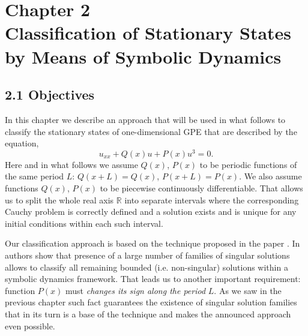 \chapter*{{\normalfont Chapter 2} \\ Classification of Stationary States by Means of Symbolic Dynamics}
\label{chapter:II}

\section*{2.1 Objectives}

In this chapter we describe an approach that will be used in what follows to classify the stationary states of one-dimensional GPE that are described by the equation,
\begin{equation}
	u_{xx} + Q(x) u + P(x) u^3 = 0.
	\label{eq:stationary}
\end{equation}
Here and in what follows we assume $Q(x)$, $P(x)$ to be periodic functions of the same period $L$: $Q(x + L) = Q(x)$, $P(x + L) = P(x)$.
We also assume functions $Q(x)$, $P(x)$ to be piecewise continuously differentiable.
That allows us to split the whole real axis $\mathbb{R}$ into separate intervals where the corresponding Cauchy problem is correctly defined and a solution exists and is unique for any initial conditions within each such interval.

Our classification approach is based on the technique proposed in the paper \cite{AlfimovAvramenko}.
In \cite{AlfimovAvramenko} authors show that presence of a large number of families of singular solutions allows to classify all remaining bounded (i.e. non-singular) solutions within a symbolic dynamics framework.
That leads us to another important requirement: function $P(x)$ must {\it changes its sign along the period} $L$.
As we saw in the previous chapter such fact guarantees the existence of singular solution families that in its turn is a base of the technique and makes the announced approach even possible.

